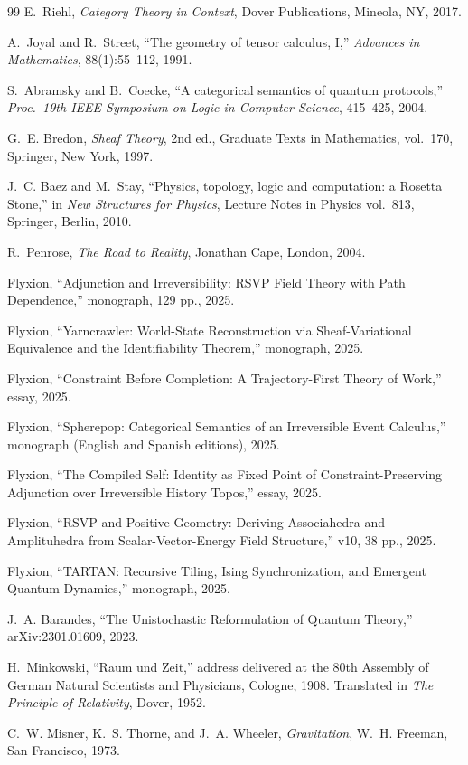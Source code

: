 \documentclass[12pt]{article}
\begin{document}
\begin{thebibliography}{99}
E.~Riehl,
\textit{Category Theory in Context},
Dover Publications, Mineola, NY, 2017.

A.~Joyal and R.~Street,
``The geometry of tensor calculus, I,''
\textit{Advances in Mathematics}, 88(1):55--112, 1991.

S.~Abramsky and B.~Coecke,
``A categorical semantics of quantum protocols,''
\textit{Proc.\ 19th IEEE Symposium on Logic in Computer Science},
415--425, 2004.

G.~E. Bredon,
\textit{Sheaf Theory}, 2nd ed.,
Graduate Texts in Mathematics, vol.~170,
Springer, New York, 1997.

J.~C. Baez and M.~Stay,
``Physics, topology, logic and computation: a Rosetta Stone,''
in \textit{New Structures for Physics}, Lecture Notes in Physics
vol.~813, Springer, Berlin, 2010.

R.~Penrose,
\textit{The Road to Reality},
Jonathan Cape, London, 2004.

Flyxion,
``Adjunction and Irreversibility: RSVP Field Theory with Path Dependence,''
monograph, 129 pp., 2025.

Flyxion,
``Yarncrawler: World-State Reconstruction via Sheaf-Variational
Equivalence and the Identifiability Theorem,''
monograph, 2025.

Flyxion,
``Constraint Before Completion: A Trajectory-First Theory of Work,''
essay, 2025.

Flyxion,
``Spherepop: Categorical Semantics of an Irreversible Event Calculus,''
monograph (English and Spanish editions), 2025.

Flyxion,
``The Compiled Self: Identity as Fixed Point of Constraint-Preserving
Adjunction over Irreversible History Topos,'' essay, 2025.

Flyxion,
``RSVP and Positive Geometry: Deriving Associahedra and Amplituhedra
from Scalar-Vector-Energy Field Structure,'' v10, 38 pp., 2025.

Flyxion,
``TARTAN: Recursive Tiling, Ising Synchronization, and Emergent
Quantum Dynamics,'' monograph, 2025.

J.~A. Barandes,
``The Unistochastic Reformulation of Quantum Theory,''
arXiv:2301.01609, 2023.

H.~Minkowski,
``Raum und Zeit,''
address delivered at the 80th Assembly of German Natural Scientists
and Physicians, Cologne, 1908. Translated in \textit{The Principle
of Relativity}, Dover, 1952.

C.~W. Misner, K.~S. Thorne, and J.~A. Wheeler,
\textit{Gravitation},
W.~H. Freeman, San Francisco, 1973.

\end{thebibliography}
\end{document}
